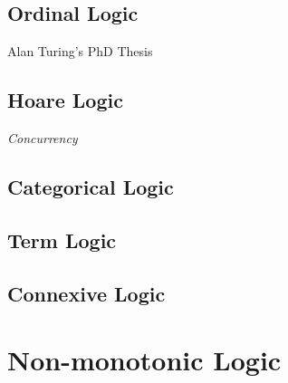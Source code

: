 \subsection{Ordinal Logic}

Alan Turing's PhD Thesis \cite{turing38}



\subsection{Hoare Logic}

\emph{Concurrency}



\subsection{Categorical Logic}

\subsection{Term Logic}\label{sec:term_logic}

\subsection{Connexive Logic}\label{sec:connexive_logic}



\section{Non-monotonic Logic}\label{sec:nonmonotonic_logic}

